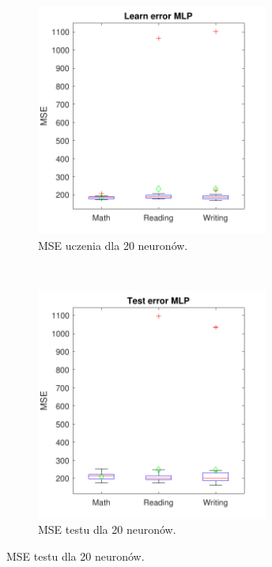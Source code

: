 \documentclass[12pt]{article}
\begin{document}
\begin{figure}[H]
\centering
\begin{subfigure}[t]{0.48\textwidth} 
\centering
\includegraphics[height=3in]{tansig_tansig_20_learnBoxplot.pdf}
\caption{MSE uczenia dla 20 neuronów.}
\end{subfigure}
~~
\begin{subfigure}[t]{0.48\textwidth} 
\centering
\includegraphics[height=3in]{tansig_tansig_20_testBoxplot.pdf}
\caption{MSE testu dla 20 neuronów.}
\end{subfigure}


\end{figure}
\end{document}
